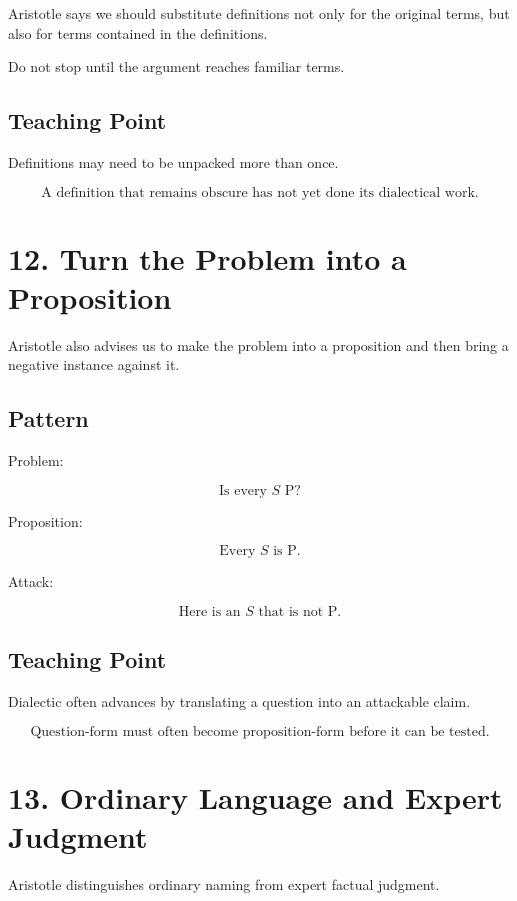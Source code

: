 \documentclass[12pt]{article}
\begin{document}
Aristotle says we should substitute definitions not only for the original terms,
but also for terms contained in the definitions.

Do not stop until the argument reaches familiar terms.

\subsection*{Teaching Point}

Definitions may need to be unpacked more than once.

\[
\boxed{
\text{A definition that remains obscure has not yet done its dialectical work.}
}
\]

\section*{12. Turn the Problem into a Proposition}

Aristotle also advises us to make the problem into a proposition and then bring
a negative instance against it.

\subsection*{Pattern}

Problem:

\[
\text{Is every } S \text{ P?}
\]

Proposition:

\[
\text{Every } S \text{ is P.}
\]

Attack:

\[
\text{Here is an } S \text{ that is not P.}
\]

\subsection*{Teaching Point}

Dialectic often advances by translating a question into an attackable claim.

\[
\boxed{
\text{Question-form must often become proposition-form before it can be tested.}
}
\]

\section*{13. Ordinary Language and Expert Judgment}

Aristotle distinguishes ordinary naming from expert factual judgment.
\end{document}
